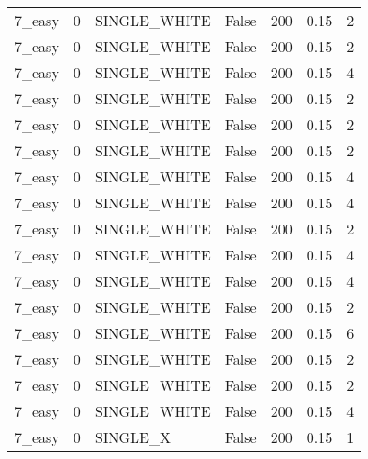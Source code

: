 \begin{tabular}{lrllrrr}
 7\_easy        &              0 & SINGLE\_WHITE    & False           &          200 &   0.15 &               2 \\
 7\_easy        &              0 & SINGLE\_WHITE    & False           &          200 &   0.15 &               2 \\
 7\_easy        &              0 & SINGLE\_WHITE    & False           &          200 &   0.15 &               4 \\
 7\_easy        &              0 & SINGLE\_WHITE    & False           &          200 &   0.15 &               2 \\
 7\_easy        &              0 & SINGLE\_WHITE    & False           &          200 &   0.15 &               2 \\
 7\_easy        &              0 & SINGLE\_WHITE    & False           &          200 &   0.15 &               2 \\
 7\_easy        &              0 & SINGLE\_WHITE    & False           &          200 &   0.15 &               4 \\
 7\_easy        &              0 & SINGLE\_WHITE    & False           &          200 &   0.15 &               4 \\
 7\_easy        &              0 & SINGLE\_WHITE    & False           &          200 &   0.15 &               2 \\
 7\_easy        &              0 & SINGLE\_WHITE    & False           &          200 &   0.15 &               4 \\
 7\_easy        &              0 & SINGLE\_WHITE    & False           &          200 &   0.15 &               4 \\
 7\_easy        &              0 & SINGLE\_WHITE    & False           &          200 &   0.15 &               2 \\
 7\_easy        &              0 & SINGLE\_WHITE    & False           &          200 &   0.15 &               6 \\
 7\_easy        &              0 & SINGLE\_WHITE    & False           &          200 &   0.15 &               2 \\
 7\_easy        &              0 & SINGLE\_WHITE    & False           &          200 &   0.15 &               2 \\
 7\_easy        &              0 & SINGLE\_WHITE    & False           &          200 &   0.15 &               4 \\
 7\_easy        &              0 & SINGLE\_X        & False           &          200 &   0.15 &               1 \\

\end{tabular}
